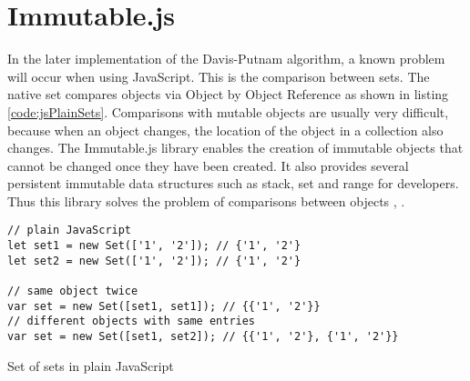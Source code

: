 \section{Immutable.js}
\label{sec:tecImmutable}
In the later implementation of the Davis-Putnam algorithm, a known problem will occur when using JavaScript. This is the comparison between sets. The native set compares objects via Object by Object Reference as shown in listing \ref{code:jsPlainSets}. Comparisons with mutable objects are usually very difficult, because when an object changes, the location of the object in a collection also changes. The Immutable.js library enables the creation of immutable objects that cannot be changed once they have been created. It also provides several persistent immutable data structures such as stack, set and range for developers. Thus this library solves the problem of comparisons between objects \cite{Immutable.jsAuthors2019}, \cite{Rauschmayer2015}.

\begin{listing}[h!]
\begin{verbatim}
// plain JavaScript
let set1 = new Set(['1', '2']); // {'1', '2'}
let set2 = new Set(['1', '2']); // {'1', '2'}

// same object twice
var set = new Set([set1, set1]); // {{'1', '2'}}
// different objects with same entries
var set = new Set([set1, set2]); // {{'1', '2'}, {'1', '2'}}
\end{verbatim}
    \caption{Set of sets in plain JavaScript}
    \label{code:jsPlainSets}
\end{listing}

